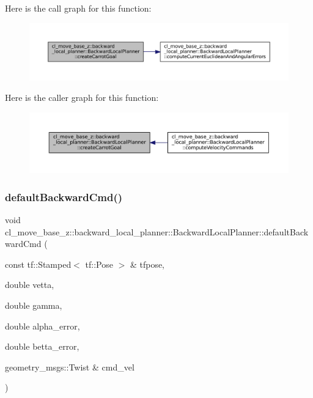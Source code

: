 Here is the call graph for this function\+:
\nopagebreak
\begin{figure}[H]
\begin{center}
\leavevmode
\includegraphics[width=350pt]{classcl__move__base__z_1_1backward__local__planner_1_1BackwardLocalPlanner_a786337a838e58b38b724bc342cf76e10_cgraph}
\end{center}
\end{figure}
Here is the caller graph for this function\+:
\nopagebreak
\begin{figure}[H]
\begin{center}
\leavevmode
\includegraphics[width=350pt]{classcl__move__base__z_1_1backward__local__planner_1_1BackwardLocalPlanner_a786337a838e58b38b724bc342cf76e10_icgraph}
\end{center}
\end{figure}
\mbox{\label{classcl__move__base__z_1_1backward__local__planner_1_1BackwardLocalPlanner_a1ebd69a028a22e3573e98f89d593f97d}} 
\subsubsection{\texorpdfstring{default\+Backward\+Cmd()}{defaultBackwardCmd()}}
{\footnotesize\ttfamily void cl\+\_\+move\+\_\+base\+\_\+z\+::backward\+\_\+local\+\_\+planner\+::\+Backward\+Local\+Planner\+::default\+Backward\+Cmd (\begin{DoxyParamCaption}\item[{const tf\+::\+Stamped$<$ tf\+::\+Pose $>$ \&}]{tfpose,  }\item[{double}]{vetta,  }\item[{double}]{gamma,  }\item[{double}]{alpha\+\_\+error,  }\item[{double}]{betta\+\_\+error,  }\item[{geometry\+\_\+msgs\+::\+Twist \&}]{cmd\+\_\+vel }\end{DoxyParamCaption})\hspace{0.3cm}{\ttfamily [private]}}

